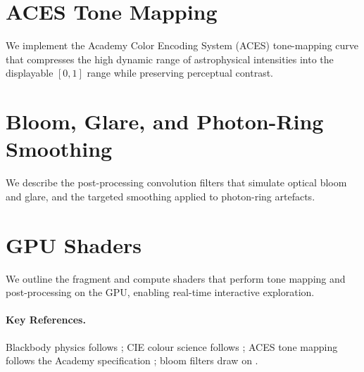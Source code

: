 \section{ACES Tone Mapping}
\label{sec:col-tonemapping}

We implement the Academy Color Encoding System (ACES) tone-mapping curve that
compresses the high dynamic range of astrophysical intensities into the
displayable $[0,1]$ range while preserving perceptual contrast.

\section{Bloom, Glare, and Photon-Ring Smoothing}
\label{sec:col-bloom}

We describe the post-processing convolution filters that simulate optical
bloom and glare, and the targeted smoothing applied to photon-ring artefacts.

\section{GPU Shaders\starmark{}}
\label{sec:col-gpu-shaders}

We outline the fragment and compute shaders that perform tone mapping and
post-processing on the GPU, enabling real-time interactive exploration.

\paragraph{Key References.}
Blackbody physics follows \cite{Rybicki1979}; CIE colour science follows
\cite{Wyszecki1982}; ACES tone mapping follows the Academy specification
\cite{ACES2014}; bloom filters draw on \cite{Pharr2016}.
